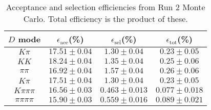 \begin{table}[H]
    \centering
    \begin{tabular}{cccc}
        \toprule
        $D$ mode & $\epsilon_\mathrm{acc}$(\%) &  $\epsilon_\mathrm{sel}$(\%) &  $\epsilon_\mathrm{tot}$(\%) \\
        \midrule
        $K\pi$ & $17.51 \pm 0.04$ & $1.30 \pm 0.04$ & $0.23 \pm 0.05$ \\
        $KK$ & $18.24 \pm 0.04$ & $1.35 \pm 0.04$ & $0.25 \pm 0.06$ \\
        $\pi\pi$ & $16.92 \pm 0.04$ & $1.57 \pm 0.04$ & $0.26 \pm 0.06$ \\
        $K\pi$ & $17.51 \pm 0.04$ & $1.30 \pm 0.04$ & $0.23 \pm 0.05$ \\
        $K\pi\pi\pi$ & $16.56 \pm 0.03$ & $0.463 \pm 0.013$ & $0.077 \pm 0.018$ \\
        $\pi\pi\pi\pi$ & $15.90 \pm 0.03$ & $0.559 \pm 0.016$ & $0.089 \pm 0.021$ \\
        \bottomrule
    \end{tabular}
    \caption{Acceptance and selection efficiencies from  Run 2 Monte Carlo. Total efficiency is the  product of these.}
\label{tab:selection_efficiency_run2}
\end{table}
